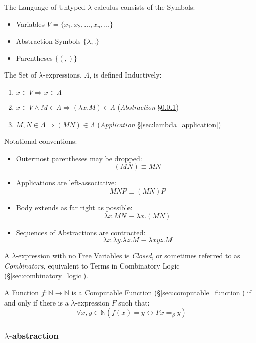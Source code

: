 The Language of Untyped $\lambda$-calculus consists of the Symbols:
\begin{itemize}
  \item Variables $V = \{ x_1, x_2, \ldots, x_n, \ldots \}$
  \item Abstraction Symbols $\{ \lambda, . \}$
  \item Parentheses $\{ (, ) \}$
\end{itemize}

The Set of $\lambda$-expressions, $\Lambda$, is defined Inductively:
\begin{enumerate}
  \item $x \in V \Rightarrow x \in \Lambda$
  \item $x \in V \wedge M \in \Lambda \Rightarrow (\lambda x.M) \in
    \Lambda$ (\emph{Abstraction} \S\ref{sec:lambda_abstraction})
  \item $M,N \in \Lambda \Rightarrow (M N) \in \Lambda$
    (\emph{Application} \S\ref{sec:lambda_application})
\end{enumerate}
Notational conventions:
\begin{itemize}
  \item Outermost parentheses may be dropped:
    \[
      (M N) \equiv M N
    \]
  \item Applications are left-associative:
    \[
      M N P \equiv (M N) P
    \]
  \item Body extends as far right as possible:
    \[
      \lambda x.M N \equiv \lambda x.(M N)
    \]
  \item Sequences of Abstractions are contracted:
    \[
      \lambda x.\lambda y.\lambda z.M \equiv
      \lambda xyz.M
    \]
\end{itemize}

A $\lambda$-expression with no Free Variables is \emph{Closed}, or
sometimes referred to as \emph{Combinators}, equivalent to Terms in
Combinatory Logic (\S\ref{sec:combinatory_logic}).

A Function $f : \mathbb{N} \rightarrow \mathbb{N}$ is a Computable
Function (\S\ref{sec:computable_function}) if and only if there is a
$\lambda$-expression $F$ such that:
\[
  \forall x,y \in \mathbb{N} (f(x)=y \leftrightarrow F x =_\beta y)
\]



\subsubsection{$\lambda$-abstraction}\label{sec:lambda_abstraction}

